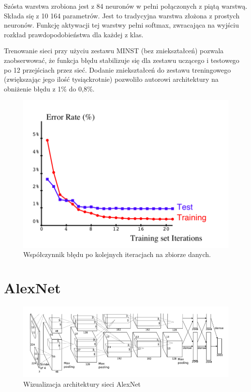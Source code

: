 \documentclass[12pt,a4paper,twoside,titlepage,openright]{book}
\begin{document}
\begin{itemize}
Szósta warstwa zrobiona jest z 84 neuronów w pełni połączonych z piątą warstwą. Składa się z 10 164 parametrów. Jest to tradycyjna warstwa złożona z prostych neuronów. Funkcję aktywacji tej warstwy pełni softmax, zwracająca na wyjściu rozkład prawdopodobieństwa dla każdej z klas.

Trenowanie sieci przy użyciu zestawu MINST (bez zniekształceń) pozwala zaobserwować, że funkcja błędu stabilizuje się dla zestawu uczącego i testowego po 12 przejściach przez sieć. Dodanie zniekształceń do zestawu treningowego (zwiększając jego ilość tysiąckrotnie) pozwoliło autorowi architektury na obniżenie błędu z 1\% do 0,8\%.

\begin{figure}[ht]
	\centering
			\includegraphics[resolution=100, scale=0.45]{leNetTraining.png}
		\caption{Współczynnik błędu po kolejnych iteracjach na zbiorze danych.}
\end{figure}


\section{AlexNet}
\begin{figure}[ht]
	\centering
			\includegraphics[resolution=100, scale=0.65]{AlexNet.png}
		\caption{Wizualizacja architektury sieci AlexNet}
				\label{fig:alexnet}
\end{figure}


\end{itemize}
\end{document}
